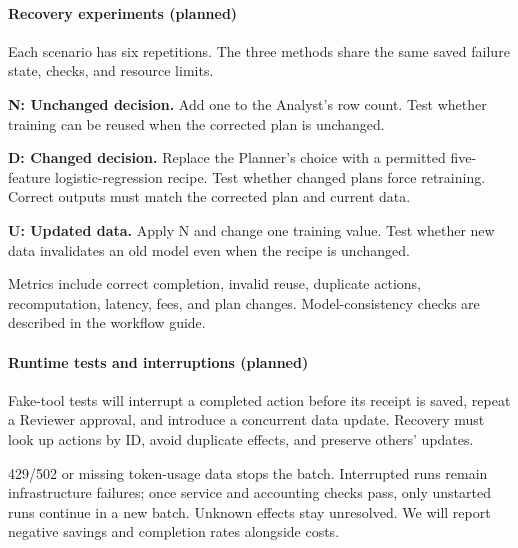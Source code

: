 \documentclass{article}
\begin{document}
\paragraph{Recovery experiments (planned)}
Each scenario has six repetitions. The three methods share the same saved failure state, checks, and resource limits.

\textbf{N: Unchanged decision.} Add one to the Analyst's row count. Test whether training can be reused when the corrected plan is unchanged.

\textbf{D: Changed decision.} Replace the Planner's choice with a permitted five-feature logistic-regression recipe. Test whether changed plans force retraining. Correct outputs must match the corrected plan and current data.

\textbf{U: Updated data.} Apply N and change one training value. Test whether new data invalidates an old model even when the recipe is unchanged.

Metrics include correct completion, invalid reuse, duplicate actions, recomputation, latency, fees, and plan changes. Model-consistency checks are described in the workflow guide.

\paragraph{Runtime tests and interruptions (planned)}
Fake-tool tests will interrupt a completed action before its receipt is saved, repeat a Reviewer approval, and introduce a concurrent data update. Recovery must look up actions by ID, avoid duplicate effects, and preserve others' updates.

429/502 or missing token-usage data stops the batch. Interrupted runs remain infrastructure failures; once service and accounting checks pass, only unstarted runs continue in a new batch. Unknown effects stay unresolved. We will report negative savings and completion rates alongside costs.

\small
\end{document}
